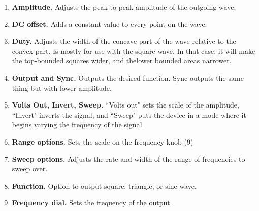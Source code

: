\begin{enumerate}
\item \textbf{Amplitude.} Adjusts the peak to peak amplitude of the outgoing wave.
\item \textbf{DC offset.} Adds a constant value to every point on the wave.
\item \textbf{Duty.} Adjusts the width of the concave part of the wave relative to the convex part. Is mostly for use with the square wave. In that case, it will make the top-bounded squares wider, and thelower bounded areas narrower.
\item \textbf{Output and Sync.} Outputs the desired function. Sync outputs the same thing but with lower amplitude.
\item \textbf{Volts Out, Invert, Sweep.} ``Volts out" sets the scale of the amplitude, ``Invert" inverts the signal, and ``Sweep" puts the device in a mode where it begins varying the frequency of the signal.
\item \textbf{Range options.} Sets the scale on the frequency knob (9)
\item \textbf{Sweep options.} Adjusts the rate and width of the range of frequencies to sweep over.
\item \textbf{Function.} Option to output square, triangle, or sine wave.
\item \textbf{Frequency dial.} Sets the frequency of the output.
\end{enumerate}
